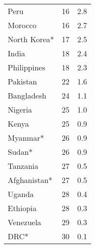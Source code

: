 \begin{longtable}[t]{lrr}
Peru & 16 & 2.8\\
Morocco & 16 & 2.7\\
North Korea* & 17 & 2.5\\
India & 18 & 2.4\\
Philippines & 18 & 2.3\\
Pakistan & 22 & 1.6\\
Bangladesh & 24 & 1.1\\
Nigeria & 25 & 1.0\\
Kenya & 25 & 0.9\\
Myanmar* & 26 & 0.9\\
Sudan* & 26 & 0.9\\
Tanzania & 27 & 0.5\\
Afghanistan* & 27 & 0.5\\
Uganda & 28 & 0.4\\
Ethiopia & 28 & 0.3\\
Venezuela & 29 & 0.3\\
DRC* & 30 & 0.1\\
\bottomrule
\end{longtable}